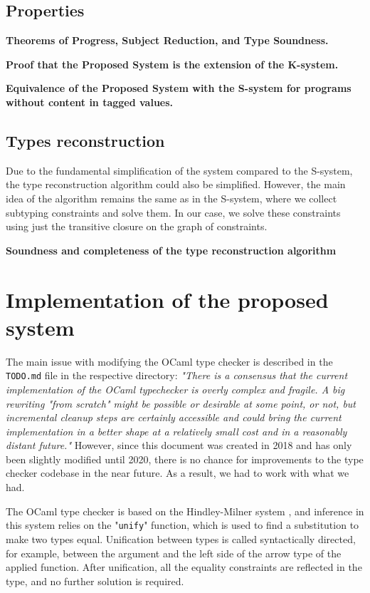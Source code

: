 \documentclass[a4paper,11pt,oneside]{article}
\theoremstyle{definition}
\begin{document}
\subsection{Properties}

\textbf{Theorems of Progress, Subject Reduction, and Type Soundness.}

\textbf{Proof that the Proposed System is the extension of the K-system.}

\textbf{Equivalence of the Proposed System with the S-system for programs without content in tagged values.}

\subsection{Types reconstruction}

Due to the fundamental simplification of the system compared to the S-system,
the type reconstruction algorithm could also be simplified. However, the main
idea of the algorithm remains the same as in the S-system, where we collect
subtyping constraints and solve them. In our case, we solve these constraints
using just the transitive closure on the graph of constraints.

\textbf{Soundness and completeness of the type reconstruction algorithm}

\section{Implementation of the proposed system}

The main issue with modifying the OCaml type checker is described in the
\texttt{TODO.md} file in the respective directory:
{\itshape
"There is a consensus that the current implementation of the OCaml typechecker
is overly complex and fragile. A big rewriting "from scratch" might be possible
or desirable at some point, or not, but incremental cleanup steps are certainly
accessible and could bring the current implementation in a better shape at a
relatively small cost and in a reasonably distant future."
}
However, since this document was created in 2018 and has
only been slightly modified until 2020, there is no chance for improvements
to the type checker codebase in the near future. As a result, we had to work
with what we had.

The OCaml type checker is based on the Hindley-Milner system \cite{Hindley_1969}
\cite{Milner_1978}, and inference in this system relies on the "\texttt{unify}"
function, which is used to find a substitution to make two types equal.
Unification between types is called syntactically directed, for example,
between the argument and the left side of the arrow type of the applied
function. After unification, all the equality constraints are reflected in
the type, and no further solution is required.
\end{document}
